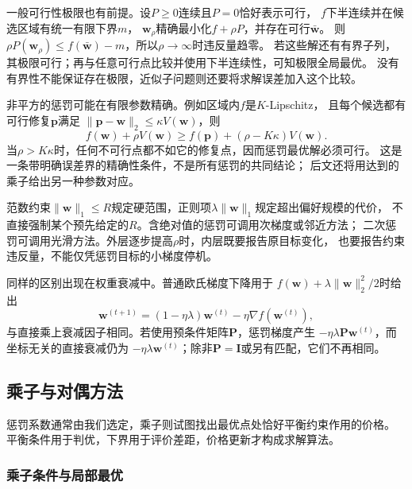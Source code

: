 一般可行性极限也有前提。设$P\geq0$连续且$P=0$恰好表示可行，
$f$下半连续并在候选区域有统一有限下界$m$，
$\bm w_\rho$精确最小化$f+\rho P$，并存在可行$\bar{\bm w}$。
则$\rho P(\bm w_\rho)\leq f(\bar{\bm w})-m$，所以$\rho\to\infty$时违反量趋零。
若这些解还有有界子列，其极限可行；再与任意可行点比较并使用下半连续性，可知极限全局最优。
没有有界性不能保证存在极限，近似子问题则还要将求解误差加入这个比较。

非平方的惩罚可能在有限参数精确。例如区域内$f$是$K$-Lipschitz，
且每个候选都有可行修复$\bm p$满足
$\|\bm p-\bm w\|_2\leq\kappa V(\bm w)$，则
\[
 f(\bm w)+\rho V(\bm w)
 \geq f(\bm p)+(\rho-K\kappa)V(\bm w).
\]
当$\rho>K\kappa$时，任何不可行点都不如它的修复点，因而惩罚最优解必须可行。
这是一条带明确误差界的精确性条件，不是所有惩罚的共同结论；
后文还将用达到的乘子给出另一种参数对应。

范数约束$\|\bm w\|_1\leq R$规定硬范围，正则项$\lambda\|\bm w\|_1$规定超出偏好规模的代价，
不直接强制某个预先给定的$R$。含绝对值的惩罚可调用次梯度或邻近方法；
二次惩罚可调用光滑方法。外层逐步提高$\rho$时，内层既要报告原目标变化，
也要报告约束违反量，不能仅凭惩罚目标的小梯度停机。

同样的区别出现在权重衰减中。普通欧氏梯度下降用于
$f(\bm{w})+\lambda\lVert\bm{w}\rVert_2^2/2$时给出
\[
  \bm{w}^{(t+1)}
  =(1-\eta\lambda)\bm{w}^{(t)}-\eta\nabla f(\bm{w}^{(t)}),
\]
与直接乘上衰减因子相同。若使用预条件矩阵$\bm{P}$，惩罚梯度产生
$-\eta\lambda\bm{P}\bm{w}^{(t)}$，而坐标无关的直接衰减仍为
$-\eta\lambda\bm{w}^{(t)}$；除非$\bm{P}=\bm{I}$或另有匹配，它们不再相同。

\subsection{乘子与对偶方法}
\label{sec:opt-multiplier-dual-methods}

惩罚系数通常由我们选定，乘子则试图找出最优点处恰好平衡约束作用的价格。
平衡条件用于判优，下界用于评价差距，价格更新才构成求解算法。

\subsubsection{乘子条件与局部最优}
\label{sec:opt-kkt}

